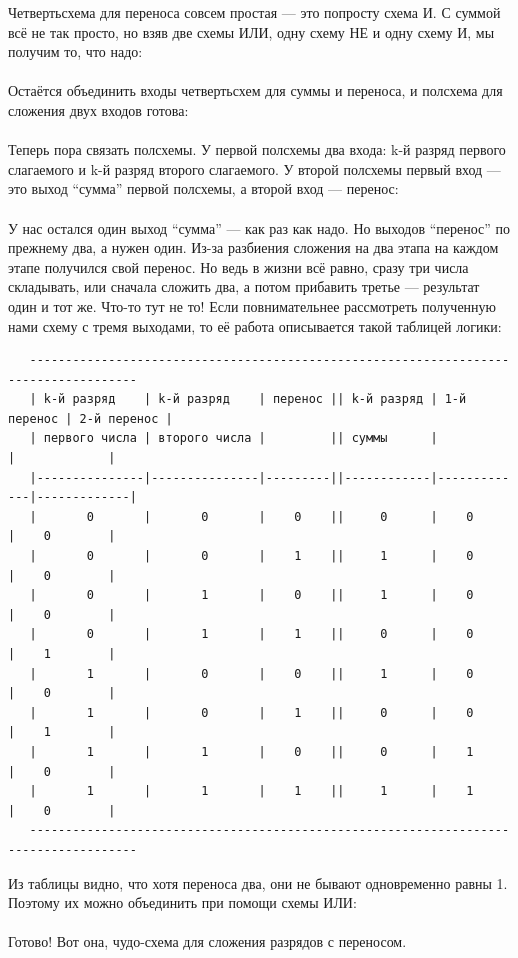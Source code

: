 \documentclass[11pt]{book}
\begin{document}
Четвертьсхема для переноса совсем простая --- это попросту схема И.
С суммой всё не так просто, но взяв две схемы ИЛИ, одну схему НЕ и одну схему И,
мы получим то, что надо:
\\ \\
Остаётся объединить входы четвертьсхем для суммы и переноса,
и полсхема для сложения двух входов готова:
\\ \\
Теперь пора связать полсхемы. У первой полсхемы два входа:
k-й разряд первого слагаемого и k-й разряд второго слагаемого.
У второй полсхемы первый вход --- это выход ``сумма'' первой полсхемы,
а второй вход --- перенос:
\\ \\
У нас остался один выход ``сумма'' --- как раз как надо. Но выходов ``перенос'' по прежнему два,
а нужен один. Из-за разбиения сложения на два этапа на каждом этапе получился свой перенос.
Но ведь в жизни всё равно, сразу три числа складывать, или сначала сложить два, а потом прибавить
третье --- результат один и тот же. Что-то тут не то! Если повнимательнее рассмотреть полученную нами схему
с тремя выходами, то её работа описывается такой таблицей логики:
\begin{verbatim}
   -------------------------------------------------------------------------------------
   | k-й разряд    | k-й разряд    | перенос || k-й разряд | 1-й перенос | 2-й перенос |
   | первого числа | второго числа |         || суммы      |             |             |
   |---------------|---------------|---------||------------|-------------|-------------|
   |       0       |       0       |    0    ||     0      |    0        |    0        |
   |       0       |       0       |    1    ||     1      |    0        |    0        |
   |       0       |       1       |    0    ||     1      |    0        |    0        |
   |       0       |       1       |    1    ||     0      |    0        |    1        |
   |       1       |       0       |    0    ||     1      |    0        |    0        |
   |       1       |       0       |    1    ||     0      |    0        |    1        |
   |       1       |       1       |    0    ||     0      |    1        |    0        |
   |       1       |       1       |    1    ||     1      |    1        |    0        |
   -------------------------------------------------------------------------------------
\end{verbatim}

Из таблицы видно, что хотя переноса два, они не бывают одновременно равны 1.
Поэтому их можно объединить при помощи схемы ИЛИ:
\\ \\
Готово! Вот она, чудо-схема для сложения разрядов с переносом.
\end{document}
